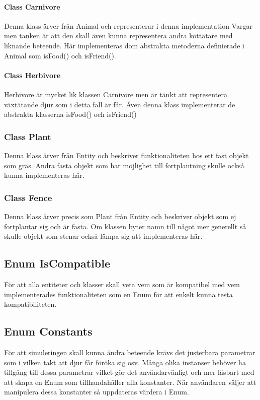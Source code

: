 \documentclass{article}
\begin{document}
\paragraph{Class Carnivore}
Denna klass ärver från Animal och representerar i denna implementation Vargar men tanken är att den skall även kunna representera andra köttätare med liknande beteende.
Här implementeras dom abstrakta metoderna definierade i Animal som isFood() och isFriend().

\paragraph{Class Herbivore}
Herbivore är mycket lik klassen Carnivore men är tänkt att representera växtätande djur som i detta fall är får. Även denna klass
implementerar de abstrakta klasserna isFood() och isFriend()

\subsubsection{Class Plant}
Denna klass ärver från Entity och beskriver funktionaliteten hos ett fast objekt som gräs. Andra fasta objekt som har möjlighet till fortplantning skulle också kunna implementeras här.

\subsubsection{Class Fence}
Denna klass ärver precis som Plant från Entity och beskriver objekt som ej fortplantar sig och är fasta. Om klassen byter namn till något mer generellt så skulle objekt som stenar också lämpa sig att implementeras här.

\subsection{Enum IsCompatible}
För att alla entiteter och klasser skall veta vem som är kompatibel med vem implementerades funktionaliteten som en Enum för att enkelt kunna testa kompatibiliteten.

\subsection{Enum Constants}
För att simuleringen skall kunna ändra beteende krävs det justerbara parametrar som i vilken takt att djur får föröka sig osv. Många olika instanser behöver ha tillgång till dessa parametrar
vilket gör det användarvänligt och mer läsbart med att skapa en Enum som tillhandahåller alla konstanter. När användaren väljer att manipulera dessa konstanter så uppdateras värdera i Enum.
\end{document}
